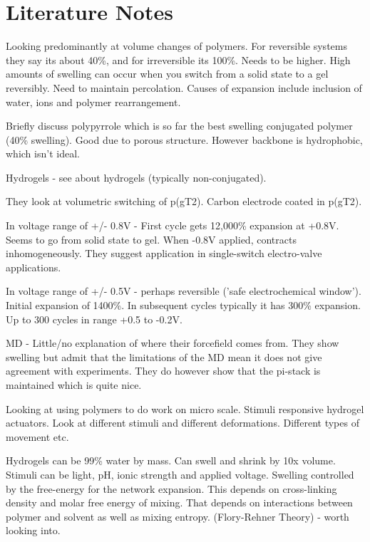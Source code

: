 \documentclass{article}
\begin{document}
\section*{Literature Notes}

{\bf \cite{Gladisch2019}}  

 Looking predominantly at volume changes of polymers.  For reversible systems they say its about 40\%, and for irreversible its 100\%.  Needs to be higher.  High amounts of swelling can occur when you switch from a solid state to a gel reversibly.  Need to maintain percolation.  Causes of expansion include inclusion of water, ions and polymer rearrangement. 

Briefly discuss polypyrrole which is so far the best swelling conjugated polymer \cite{carpi2009biomedical} (40\% swelling). Good due to porous structure. However backbone is hydrophobic, which isn't ideal.   

Hydrogels - see \cite[Ionov, 2014]{Ionov2014} about hydrogels (typically non-conjugated). 

They look at volumetric switching of p(gT2).  Carbon electrode coated in p(gT2).  

In voltage range of +/- 0.8V - First cycle gets 12,000\% expansion at +0.8V.   Seems to go from solid state to gel.   When -0.8V applied, contracts inhomogeneously.  They suggest application in single-switch electro-valve applications. 

In voltage range of +/- 0.5V - perhaps reversible ('safe electrochemical window').  Initial expansion of 1400\%.  In subsequent cycles typically it has 300\% expansion. Up to 300 cycles in range +0.5 to -0.2V. 

MD - Little/no explanation of where their forcefield comes from.  They show swelling but admit that the limitations of the MD mean it does not give agreement with experiments.  They do however show that the pi-stack is maintained which is quite nice.  

\vspace{1cm}
{\bf \cite{Ionov2014}}

Looking at using polymers to do work on micro scale.  Stimuli responsive hydrogel actuators.  Look at different stimuli and different deformations. Different types of movement etc. 

Hydrogels can be 99\% water by mass. Can swell and shrink by 10x volume. Stimuli can be light, pH, ionic strength and applied voltage.  Swelling controlled by the free-energy for the network expansion. This depends on cross-linking density and molar free energy of mixing. That depends on interactions between polymer and solvent as well as mixing entropy.  (Flory-Rehner Theory) - worth looking into. 
\end{document}
